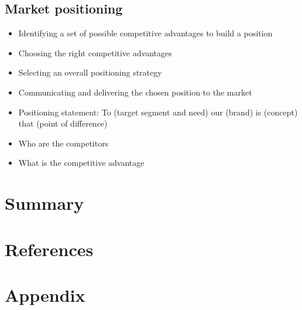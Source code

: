 \subsection{Market positioning}

\begin{itemize}
   \item Identifying a set of possible competitive advantages to build a position
   \item Choosing the right competitive advantages
   \item Selecting an overall positioning strategy
   \item Communicating and delivering the chosen position to the market
   \item Positioning statement:  To (target segment and need) our (brand) is (concept) that (point of difference)
\end{itemize}

\begin{itemize}
   \item Who are the competitors
   \item What is the competitive advantage
\end{itemize}


\section{Summary}

\section{References}



\section{Appendix}



